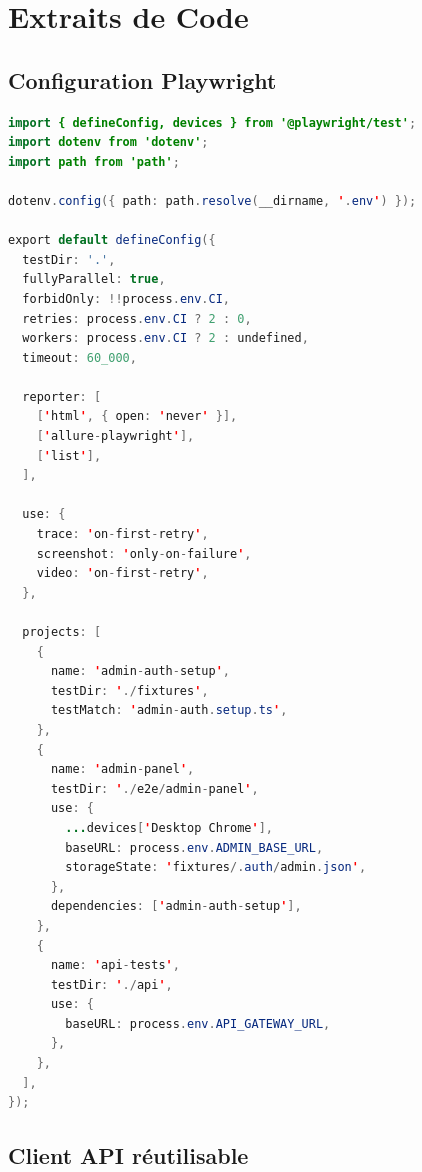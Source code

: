 \chapter{Extraits de Code}
\label{annexe:code}

\section{Configuration Playwright}

\begin{lstlisting}[language=Java, caption={playwright.config.ts --- Configuration principale}, label={lst:playwright-config}]
import { defineConfig, devices } from '@playwright/test';
import dotenv from 'dotenv';
import path from 'path';

dotenv.config({ path: path.resolve(__dirname, '.env') });

export default defineConfig({
  testDir: '.',
  fullyParallel: true,
  forbidOnly: !!process.env.CI,
  retries: process.env.CI ? 2 : 0,
  workers: process.env.CI ? 2 : undefined,
  timeout: 60_000,

  reporter: [
    ['html', { open: 'never' }],
    ['allure-playwright'],
    ['list'],
  ],

  use: {
    trace: 'on-first-retry',
    screenshot: 'only-on-failure',
    video: 'on-first-retry',
  },

  projects: [
    {
      name: 'admin-auth-setup',
      testDir: './fixtures',
      testMatch: 'admin-auth.setup.ts',
    },
    {
      name: 'admin-panel',
      testDir: './e2e/admin-panel',
      use: {
        ...devices['Desktop Chrome'],
        baseURL: process.env.ADMIN_BASE_URL,
        storageState: 'fixtures/.auth/admin.json',
      },
      dependencies: ['admin-auth-setup'],
    },
    {
      name: 'api-tests',
      testDir: './api',
      use: {
        baseURL: process.env.API_GATEWAY_URL,
      },
    },
  ],
});
\end{lstlisting}

\section{Client API réutilisable}


